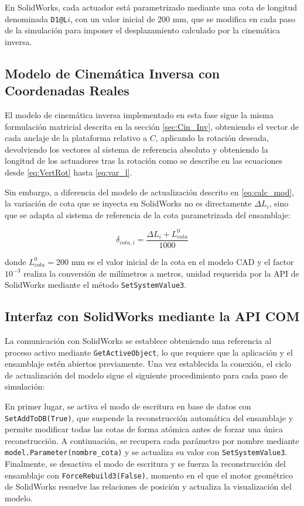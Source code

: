 En SolidWorks, cada actuador está parametrizado mediante una cota de longitud denominada \texttt{D1@L}$i$, con un valor inicial de 200 mm, que se modifica en cada paso de la simulación para imponer el desplazamiento calculado por la cinemática inversa.

\subsection{Modelo de Cinemática Inversa con Coordenadas Reales}

El modelo de cinemática inversa implementado en esta fase sigue la misma formulación matricial descrita en la sección \ref{sec:Cin_Inv}, obteniendo el vector de cada anclaje de la plataforma relativo a $C$, aplicando la rotación deseada, devolviendo los vectores al sistema de referencia absoluto y obteniendo la longitud de los actuadores tras la  rotación como se describe en las ecuaciones desde \eqref{eq:VertRot} hasta \eqref{eq:var_l}.

Sin embargo, a diferencia del modelo de actualización descrito en \ref{eq:calc_mod}, la variación de cota que se inyecta en SolidWorks no es directamente $\Delta L_i$, sino que se adapta al sistema de referencia de la cota parametrizada del ensamblaje:

\begin{equation}
\delta_{cota,i}=\frac{\Delta L_i+L_{cota}^0}{1000}
\label{eq:delta_cota}
\end{equation}

donde $L_{cota}^0=200$ mm es el valor inicial de la cota en el modelo CAD y el factor $10^{-3}$ realiza la conversión de milímetros a metros, unidad requerida por la API de SolidWorks mediante el método \texttt{SetSystemValue3}.

\subsection{Interfaz con SolidWorks mediante la API COM}

La comunicación con SolidWorks se establece obteniendo una referencia al proceso activo mediante \texttt{GetActiveObject}, lo que requiere que la aplicación y el ensamblaje estén abiertos previamente. Una vez establecida la conexión, el ciclo de actualización del modelo sigue el siguiente procedimiento para cada paso de simulación:

En primer lugar, se activa el modo de escritura en base de datos con \texttt{SetAddToDB(True)}, que suspende la reconstrucción automática del ensamblaje y permite modificar todas las cotas de forma atómica antes de forzar una única reconstrucción. A continuación, se recupera cada parámetro por nombre mediante \texttt{model.Parameter(nombre\_cota)} y se actualiza su valor con \texttt{SetSystemValue3}. Finalmente, se desactiva el modo de escritura y se fuerza la reconstrucción del ensamblaje con \texttt{ForceRebuild3(False)}, momento en el que el motor geométrico de SolidWorks resuelve las relaciones de posición y actualiza la visualización del modelo.

